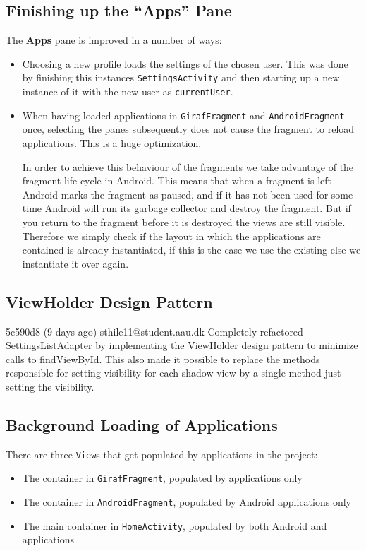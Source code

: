\subsection{Finishing up the ``Apps'' Pane}

The \textbf{Apps} pane is improved in a number of ways:
\begin{itemize}
\item Choosing a new profile loads the settings of the chosen user.
This was done by finishing this instances \lstinline|SettingsActivity| and then starting up a new instance of it with the new user as \lstinline|currentUser|.
\item When having loaded applications in \lstinline|GirafFragment| and \lstinline|AndroidFragment| once, selecting the panes subsequently does not cause the fragment to reload applications. This is a huge optimization.

In order to achieve this behaviour of the fragments we take advantage of the fragment life cycle in Android. This means that when a fragment is left Android marks the fragment as paused, and if it has not been used for some time Android will run its garbage collector and destroy the fragment. But if you return to the fragment before it is destroyed the views are still visible. Therefore we simply check if the layout in which the applications are contained is already instantiated, if this is the case we use the existing else we instantiate it over again.

\end{itemize}

\subsection{ViewHolder Design Pattern}
5c590d8 (9 days ago) sthile11@student.aau.dk Completely refactored SettingsListAdapter by implementing the ViewHolder design pattern to minimize calls to findViewById. This also made it possible to replace the methods responsible for setting visibility for each shadow view by a single method just setting the visibility.

\subsection{Background Loading of Applications}\label{sec:sprint4:dev:loadapplicationtask}
There are three \lstinline!View!s that get populated by applications in the \launcher project:

\begin{itemize}
\item The container in \lstinline!GirafFragment!, populated by \giraf applications only
\item The container in \lstinline!AndroidFragment!, populated by Android applications only
\item The main container in \lstinline!HomeActivity!, populated by both Android and \giraf applications
\end{itemize}

